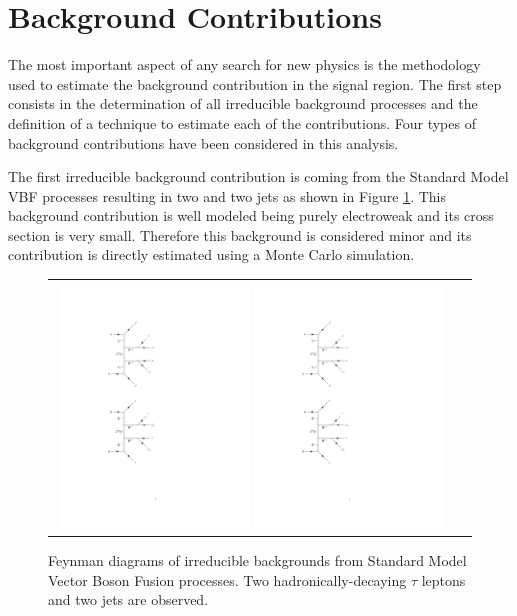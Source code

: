 \section{Background Contributions}

The most important aspect of any search for new physics is the methodology used to estimate the background contribution in the signal region. The first step consists in the determination of all irreducible background processes and the definition of a technique to estimate each of the contributions. Four types of background contributions have been considered in this analysis. 

The first irreducible background contribution is coming from the Standard Model VBF processes resulting in two \hadtau and two jets as shown in Figure \ref{fig:background_SMVBF}. This background contribution is well modeled being purely electroweak and its cross section is very small. Therefore this background is considered minor and its contribution is directly estimated using a Monte Carlo simulation.

\begin{figure}[tbh!]
	\centering
	\begin{tabular}{cc}
		\includegraphics[width=0.48\textwidth]{diagrams/pics/background_SMVBFminus.pdf}
		\includegraphics[width=0.48\textwidth]{diagrams/pics/background_SMVBFplus.pdf} 		
	\end{tabular}
	\caption{Feynman diagrams of irreducible backgrounds from Standard Model Vector Boson Fusion processes. Two hadronically-decaying $\tau$ leptons and two jets are observed. }
	\label{fig:background_SMVBF}
\end{figure}

